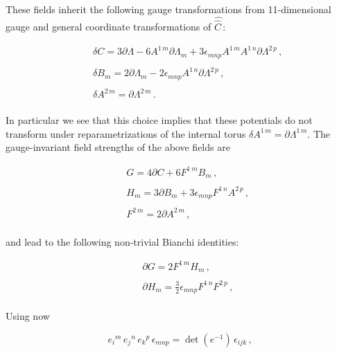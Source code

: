 \documentclass[12pt,a4paper]{article}
\begin{document}
\noindent These fields inherit the following gauge transformations from
11-dimensional gauge and general coordinate transformations of
$\hat{\hat{C}\,}$:

\begin{equation}
\begin{array}{rcl}
& & \delta C = 3\partial\Lambda -6A^{1\, m}\partial \Lambda_{m}
+3\epsilon_{mnp} A^{1\, m} A^{1\, n} \partial\Lambda^{2\, p}\, ,\\
& & \\
& & \delta B_{m} = 2 \partial \Lambda_{m} 
-2\epsilon_{mnp}A^{1\, n} \partial\Lambda^{2\, p}\, ,\\
& & \\
& & \delta A^{2\, m} = \partial\Lambda^{2\, m}\, .\\
\end{array}
\end{equation}

\noindent In particular we see that this choice implies that these potentials
do not transform under reparametrizations of the internal torus
$\delta A^{1\, m}=\partial \Lambda^{1\, m}$.  The gauge-invariant
field strengths of the above fields are

\begin{equation}
\label{eq:fieldstrengths2}
\begin{array}{rcl}
& & G = 4 \partial C +6 F^{1\, m} B_{m}\, ,\\
& & \\
& & H_{m} = 3\partial B_{m} +3\epsilon_{mnp}F^{1\, n}A^{2\, p}\, ,\\
& & \\
& & F^{2\, m} = 2\partial A^{2\, m}\, ,\\
\end{array}
\end{equation}

\noindent and lead to the following non-trivial Bianchi identities:


\begin{equation}
\begin{array}{rcl}
& & \partial G = 2 F^{1\, m} H_{m}\, ,\\
& & \\
& & \partial H_{m} = \frac{3}{2}\epsilon_{mnp}F^{1\, n}F^{2\, p}\, ,\\
\end{array}
\end{equation}

Using now

\begin{equation}
 e_{i}{}^{m}\, e_{j}{}^{n}\, e_{k}{}^{p}\, \epsilon_{mnp}
 = \det(e^{-1})\, \epsilon_{ijk}\, ,
\end{equation}
\end{document}
